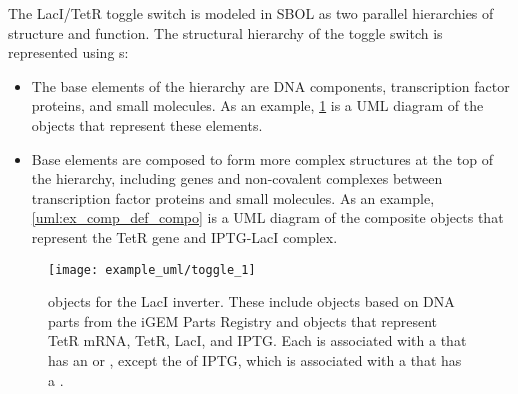 The LacI/TetR toggle switch is modeled in SBOL as two parallel hierarchies of structure and function. The structural hierarchy of the toggle switch is represented using s:
\begin{itemize}
\item The base elements of the hierarchy are DNA components, transcription factor proteins, and small molecules. As an example, \ref{uml:ex_comp_defs} is a UML diagram of the  objects that represent these elements.
\item Base elements are composed to form more complex structures at the top of the hierarchy, including genes and non-covalent complexes between transcription factor proteins and small molecules. As an example, \ref{uml:ex_comp_def_compo} is a UML diagram of the composite  objects that represent the TetR gene and IPTG-LacI complex.
\end{itemize}

\begin{figure}[ht]
\begin{center}
\texttt{[image: example\_uml/toggle\_1]}
\caption[]{ objects for the LacI inverter. These include  objects based on DNA parts from the iGEM Parts Registry and   objects that represent TetR mRNA, TetR, LacI, and IPTG. Each  is associated with a  that has an  or  , except the  of IPTG, which is associated with a  that has a  .}
\label{uml:ex_comp_defs}
\end{center}
\end{figure}


